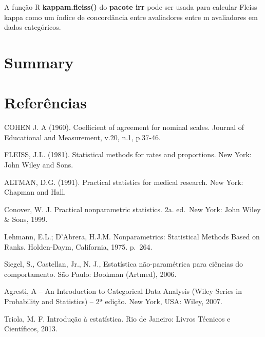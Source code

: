 \documentclass[
  letterpaper,
  DIV=11,
  numbers=noendperiod]{scrreprt}
\begin{document}
A função R \textbf{kappam.fleiss()} do \textbf{pacote irr} pode ser
usada para calcular Fleiss kappa como um índice de concordância entre
avaliadores entre m avaliadores em dados categóricos.


\hypertarget{summary}{%
\chapter{Summary}\label{summary}}


\hypertarget{referuxeancias}{%
\chapter*{Referências}\label{referuxeancias}}


COHEN J. A (1960). Coefficient of agreement for nominal scales. Journal
of Educational and Measurement, v.20, n.1, p.37-46.

FLEISS, J.L. (1981). Statistical methods for rates and proportions. New
York: John Wiley and Sons.

ALTMAN, D.G. (1991). Practical statistics for medical research. New
York: Chapman and Hall.

Conover, W. J. Practical nonparametric statistics. 2a. ed.~New York:
John Wiley \& Sons, 1999.

Lehmann, E.L.; D'Abrera, H.J.M. Nonparametrics: Statistical Methods
Based on Ranks. Holden-Daym, California, 1975. p.~264.

Siegel, S., Castellan, Jr., N. J., Estatística não-paramétrica para
ciências do comportamento. São Paulo: Bookman (Artmed), 2006.

Agresti, A -- An Introduction to Categorical Data Analysis (Wiley Series
in Probability and Statistics) -- 2ª edição. New York, USA: Wiley, 2007.

Triola, M. F. Introdução à estatística. Rio de Janeiro: Livros Técnicos
e Científicos, 2013.
\end{document}
